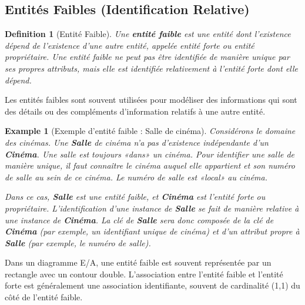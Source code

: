 \documentclass{article}
\newtheorem{definition}{Definition}
\newtheorem{example}{Example}
\begin{document}
\subsection{Entités Faibles (Identification Relative)}

\begin{definition}[Entité Faible]
    Une \textbf{entité faible} est une entité dont l'existence dépend de l'existence d'une autre entité, appelée entité forte ou entité propriétaire.  Une entité faible ne peut pas être identifiée de manière unique par ses propres attributs, mais elle est identifiée relativement à l'entité forte dont elle dépend.
\end{definition}

Les entités faibles sont souvent utilisées pour modéliser des informations qui sont des détails ou des compléments d'information relatifs à une autre entité.

\begin{example}[Exemple d'entité faible : Salle de cinéma]
    Considérons le domaine des cinémas.  Une \textbf{Salle} de cinéma n'a pas d'existence indépendante d'un \textbf{Cinéma}.  Une salle est toujours «dans» un cinéma.  Pour identifier une salle de manière unique, il faut connaître le cinéma auquel elle appartient et son numéro de salle au sein de ce cinéma.  Le numéro de salle est «local» au cinéma.

    Dans ce cas, \textbf{Salle} est une entité faible, et \textbf{Cinéma} est l'entité forte ou propriétaire.  L'identification d'une instance de \textbf{Salle} se fait de manière relative à une instance de \textbf{Cinéma}.  La clé de \textbf{Salle} sera donc composée de la clé de \textbf{Cinéma} (par exemple, un identifiant unique de cinéma) et d'un attribut propre à \textbf{Salle} (par exemple, le numéro de salle).
\end{example}

Dans un diagramme E/A, une entité faible est souvent représentée par un rectangle avec un contour double. L'association entre l'entité faible et l'entité forte est généralement une association identifiante, souvent de cardinalité (1,1) du côté de l'entité faible.
\end{document}
